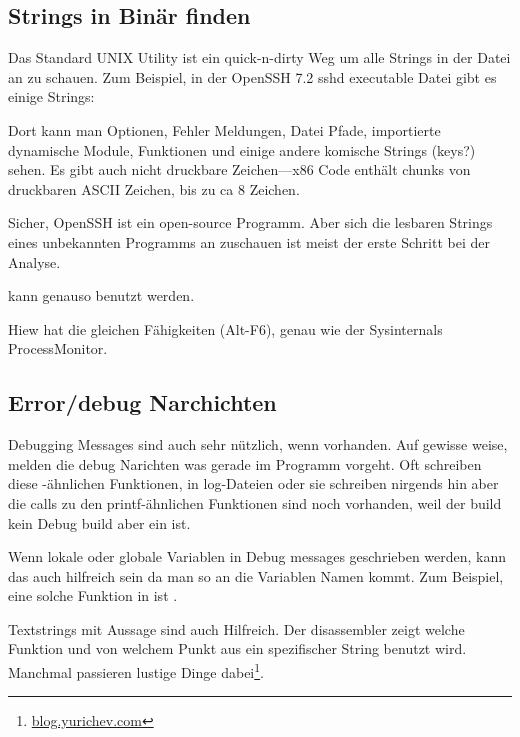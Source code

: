 \label{sec:digging_strings}



\subsection{Strings in Bin\"ar finden}

Das Standard UNIX  Utility ist ein quick-n-dirty Weg um alle Strings in der 
Datei an zu schauen. Zum Beispiel, in der OpenSSH 7.2 sshd executable Datei gibt es einige Strings:



Dort kann man Optionen, Fehler Meldungen, Datei Pfade, importierte dynamische Module, Funktionen und einige andere komische 
Strings (keys?) sehen. Es gibt auch nicht druckbare Zeichen---x86 Code enth\"alt chunks von druckbaren ASCII Zeichen, bis zu ca 8 Zeichen. %

Sicher, OpenSSH ist ein open-source Programm.
Aber sich die lesbaren Strings eines unbekannten Programms an zuschauen ist meist der erste Schritt bei 
der Analyse. 

 kann genauso benutzt werden.

Hiew hat die gleichen F\"ahigkeiten (Alt-F6), genau wie der Sysinternals ProcessMonitor.

\subsection{Error/debug Narchichten}

Debugging Messages sind auch sehr n\"utzlich, wenn vorhanden.
Auf gewisse weise, melden die debug Narichten was gerade
im Programm vorgeht. Oft schreiben diese \printf-\"ahnlichen Funktionen, in
log-Dateien oder sie schreiben nirgends hin aber die calls zu den printf-\"ahnlichen Funktionen sind noch vorhanden, 
weil der build kein Debug build aber ein  ist. %
\myindex{\oracle}

Wenn lokale oder globale Variablen in Debug messages geschrieben werden, kann das auch 
hilfreich sein da man so an die Variablen Namen kommt.
Zum Beispiel, eine solche Funktion in \oracle ist .

Textstrings mit Aussage sind auch Hilfreich.
Der \IDA disassembler zeigt welche Funktion und von welchem Punkt aus ein spezifischer String benutzt wird.
Manchmal passieren lustige Dinge dabei\footnote{\href{http://go.yurichev.com/17223}{blog.yurichev.com}}.

